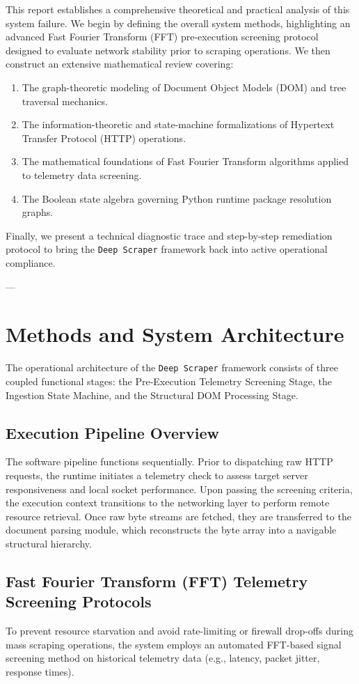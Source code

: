 \documentclass{article}
\begin{document}
This report establishes a comprehensive theoretical and practical analysis of this system failure. We begin by defining the overall system methods, highlighting an advanced Fast Fourier Transform (FFT) pre-execution screening protocol designed to evaluate network stability prior to scraping operations. We then construct an extensive mathematical review covering:
\begin{enumerate}
    \item The graph-theoretic modeling of Document Object Models (DOM) and tree traversal mechanics.
    \item The information-theoretic and state-machine formalizations of Hypertext Transfer Protocol (HTTP) operations.
    \item The mathematical foundations of Fast Fourier Transform algorithms applied to telemetry data screening.
    \item The Boolean state algebra governing Python runtime package resolution graphs.
\end{enumerate}
Finally, we present a technical diagnostic trace and step-by-step remediation protocol to bring the \texttt{Deep Scraper} framework back into active operational compliance.

---

\section{Methods and System Architecture}

The operational architecture of the \texttt{Deep Scraper} framework consists of three coupled functional stages: the Pre-Execution Telemetry Screening Stage, the Ingestion State Machine, and the Structural DOM Processing Stage.

\subsection{Execution Pipeline Overview}
The software pipeline functions sequentially. Prior to dispatching raw HTTP requests, the runtime initiates a telemetry check to assess target server responsiveness and local socket performance. Upon passing the screening criteria, the execution context transitions to the networking layer to perform remote resource retrieval. Once raw byte streams are fetched, they are transferred to the document parsing module, which reconstructs the byte array into a navigable structural hierarchy.

\subsection{Fast Fourier Transform (FFT) Telemetry Screening Protocols}
To prevent resource starvation and avoid rate-limiting or firewall drop-offs during mass scraping operations, the system employs an automated FFT-based signal screening method on historical telemetry data (e.g., latency, packet jitter, response times). 
\end{document}
